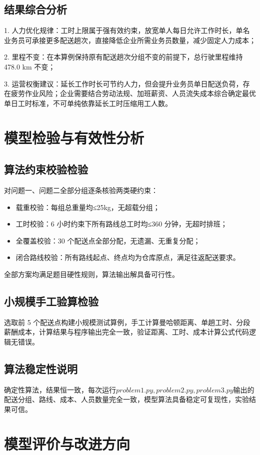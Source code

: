 \documentclass[withoutpreface,bwprint]{cumcmthesis} %
\begin{document}
\subsection{结果综合分析}
1.	人力优化规律：工时上限属于强有效约束，放宽单人每日允许工作时长，单名业务员可承接更多配送趟次，直接降低企业所需业务员数量，减少固定人力成本；
\par 2.	里程不变：在本算例保持原有配送趟次分组不变的前提下，总行驶里程维持 478.0 km 不变；
\par 3.	运营权衡建议：延长工作时长可节约人力，但会提升业务员单日配送负荷，存在疲劳作业风险；企业需要结合劳动法规、加班薪资、人员流失成本综合确定最优单日工时标准，不可单纯依靠延长工时压缩用工人数。


\section{模型检验与有效性分析}
\subsection{算法约束校验检验}
对问题一、问题二全部分组逐条核验两类硬约束：
\begin{itemize}
    \item 载重校验：每组总重量均≤25kg，无超载分组；
    \item 工时校验：6 小时约束下所有路线总工时均≤360 分钟，无超时排班；
    \item 全覆盖校验：30 个配送点全部分配，无遗漏、无重复分配；
    \item 闭合路线校验：所有路线起点、终点均为仓库原点，满足往返配送要求。
\end{itemize}
	全部方案均满足题目硬性规则，算法输出解具备可行性。

\subsection{小规模手工验算检验}
选取前 5 个配送点构建小规模测试算例，手工计算曼哈顿距离、单趟工时、分段薪酬成本，计算结果与程序输出完全一致，验证距离、工时、成本计算公式代码逻辑无错误。

\subsection{算法稳定性说明}
确定性算法，结果恒一致，每次运行\(problem1.py,problem2.py,problem3.py\)输出的配送分组、路线、成本、人员数量完全一致，模型算法具备稳定可复现性，实验结果可信。

\section{模型评价与改进方向}
\end{document}
